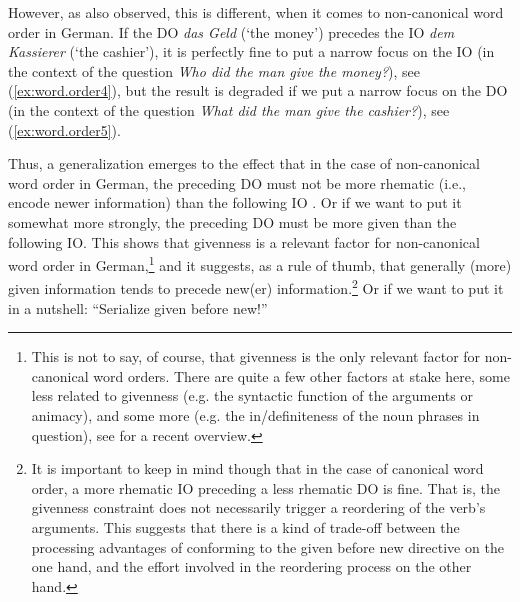 \documentclass[output=paper,colorlinks,citecolor=brown]{langscibook}
\begin{document}
However, as \citet{lenerz1977} also observed, this is different, when it comes to non-canonical word order in German. If the DO \textit{das Geld} (`the money') precedes the IO \textit{dem Kassierer} (`the cashier'), it is perfectly fine to put a narrow focus on the IO (in the context of the question \textit{Who did the man give the money?}), see (\ref{ex:word.order4}), but the result is degraded if we put a narrow focus on the DO (in the context of the question \textit{What did the man give the cashier?}), see (\ref{ex:word.order5}).  

\begin{exe}
\end{exe}      

Thus, a generalization emerges to the effect that in the case of non-canonical word order in German, the preceding DO must not be more rhematic (i.e., encode newer information) than the following IO \citep[see][45]{lenerz1977}. Or if we want to put it somewhat more strongly, the preceding DO must be more given than the following IO. This shows that givenness is a relevant factor for non-canonical word order in German,\footnote{This is not to say, of course, that givenness is the only relevant factor for non-canonical word orders. There are quite a few other factors at stake here, some less related to givenness (e.g. the syntactic function of the arguments or animacy), and some more (e.g. the in/definiteness of the noun phrases in question), see \citet{rauth2020} for a recent overview.} and it suggests, as a rule of thumb, that generally (more) given information tends to precede new(er) information.\footnote{It is important to keep in mind though that in the case of canonical word order, a more rhematic IO preceding a less rhematic DO is fine. That is, the givenness constraint does not necessarily trigger a reordering of the verb's arguments. This suggests that there is a kind of trade-off between the processing advantages of conforming to the given before new directive on the one hand, and the effort involved in the reordering process on the other hand.} Or if we want to put it in a nutshell: ``Serialize given before new!'' 
\end{document}
